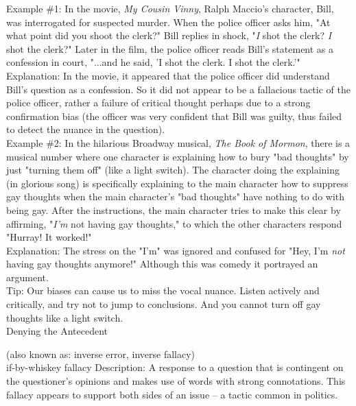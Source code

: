 \documentclass[a4paper,12pt,single,pdftex]{scrartcl}
\begin{document}
    
      Example \#1: In the movie, {\it My Cousin Vinny}, Ralph Maccio's character, Bill, was interrogated for suspected murder. When the police officer asks him, "At what point did you shoot the clerk?" Bill replies in shock, "{\em I} shot the clerk? {\em I} shot the clerk?" Later in the film, the police officer reads Bill's statement as a confession in court, "...and he said, 'I shot the clerk. I shot the clerk.'"
    \\

    
      Explanation: In the movie, it appeared that the police officer did understand Bill's question as a confession. So it did not appear to be a fallacious tactic of the police officer, rather a failure of critical thought perhaps due to a strong confirmation bias (the officer was very confident that Bill was guilty, thus failed to detect the nuance in the question).
    \\

    
      Example \#2: In the hilarious Broadway musical, {\it The Book of Mormon}, there is a musical number where one character is explaining how to bury "bad thoughts" by just "turning them off" (like a light switch). The character doing the explaining (in glorious song) is specifically explaining to the main character how to suppress gay thoughts when the main character's "bad thoughts" have nothing to do with being gay. After the instructions, the main character tries to make this clear by affirming, "{\it I'm} not having gay thoughts," to which the other characters respond "Hurray! It worked!"
    \\

    
      Explanation: The stress on the "I'm" was ignored and confused for "Hey, I'm {\it not} having gay thoughts anymore!" Although this was comedy it portrayed an argument.
    \\

    
      Tip: Our biases can cause us to miss the vocal nuance. Listen actively and critically, and try not to jump to conclusions. And you cannot turn off gay thoughts like a light switch.
    \\

  

Denying the Antecedent
    
      (also known as: inverse error, inverse fallacy)
    \\

  

if-by-whiskey fallacy
    Description: A response to a question that is contingent on the questioner’s opinions and makes use of words with strong connotations.  This fallacy appears to support both sides of an issue -- a tactic common in politics.
\end{document}
